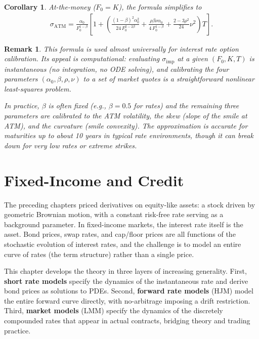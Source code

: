 \documentclass{report}
\theoremstyle{spacedplain}
\newtheorem{corollary}[theorem]{Corollary}
\theoremstyle{spaceddefinition}
\theoremstyle{spacedremark}
\newtheorem{remark}[theorem]{Remark}
\begin{document}
\begin{corollary}
At-the-money ($F_0 = K$), the formula simplifies to
\begin{align}
    \sigma_{\mathrm{ATM}} = \frac{\alpha_0}{F_0^{1-\beta}}\left[1 + \left(\frac{(1-\beta)^2\alpha_0^2}{24\,F_0^{2-2\beta}} + \frac{\rho\beta\nu\alpha_0}{4\,F_0^{1-\beta}} + \frac{2-3\rho^2}{24}\nu^2\right)T\right].
\end{align}
\end{corollary}

\begin{remark}
This formula is used almost universally for interest rate option calibration. Its appeal is computational: evaluating $\sigma_{\text{imp}}$ at a given $(F_0, K, T)$ is instantaneous (no integration, no ODE solving), and calibrating the four parameters $(\alpha_0, \beta, \rho, \nu)$ to a set of market quotes is a straightforward nonlinear least-squares problem.

In practice, $\beta$ is often fixed (e.g., $\beta = 0.5$ for rates) and the remaining three parameters are calibrated to the ATM volatility, the skew (slope of the smile at ATM), and the curvature (smile convexity). The approximation is accurate for maturities up to about 10 years in typical rate environments, though it can break down for very low rates or extreme strikes.
\end{remark}



\chapter{Fixed-Income and Credit}

The preceding chapters priced derivatives on equity-like assets: a stock driven by geometric Brownian motion, with a constant risk-free rate serving as a background parameter. In fixed-income markets, the interest rate itself is the asset. Bond prices, swap rates, and cap/floor prices are all functions of the stochastic evolution of interest rates, and the challenge is to model an entire curve of rates (the term structure) rather than a single price.

This chapter develops the theory in three layers of increasing generality. First, \textbf{short rate models} specify the dynamics of the instantaneous rate and derive bond prices as solutions to PDEs. Second, \textbf{forward rate models} (HJM) model the entire forward curve directly, with no-arbitrage imposing a drift restriction. Third, \textbf{market models} (LMM) specify the dynamics of the discretely compounded rates that appear in actual contracts, bridging theory and trading practice.
\end{document}
